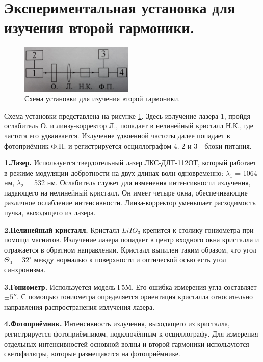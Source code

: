 \documentclass[12pt]{article}
\begin{document}
\section{Экспериментальная установка для изучения второй гармоники.}

\begin{figure}
  \begin{center}
    \includegraphics[width=0.48\textwidth]{pic2.png}
  \end{center}
  \caption{Схема установки для изучения второй гармоники.}
  \label{pic2}
\end{figure}
\hspace{0.5cm}
Схема установки представлена на рисунке \ref{pic2}. Здесь излучение лазера 1, пройдя ослабитель О. и линзу-корректор Л., попадает в нелинейный кристалл Н.К., где частота его удваивается. Излучение удвоенной частоты далее попадает в фотоприёмник Ф.П. и регистрируется осциллографом 4. 2 и 3 - блоки питания.

\textbf{1.}\textbf{Лазер.} Используется твердотельный лазер ЛКС-ДЛТ-112ОТ, который работает в режиме модуляции добротности на двух длинах волн одновременно: $\lambda_1$ = 1064 нм, $\lambda_2$ = 532 нм. Ослабитель служет для изменения интенсивности излучения, падающего на нелинейный кристалл. Он имеет четыре окна, обеспечивающие различное ослабление интенсивности. Линза-корректор уменьшает расходимость пучка, выходящего из лазера.

\textbf{2.}\textbf{Нелинейный кристалл.} Кристалл $LiIO_3$ крепится к столику гониометра при помощи магнитов. Излучение лазера попадает в центр входного окна кристалла и отражается в обратном направлении. Кристалл выпилен таким образом, что угол $\Theta_0=32^{\circ}$ между нормалью к поверхности и оптической осью есть угол синхронизма.

\textbf{3.}\textbf{Гониометр.} Используется модель Г5М. Его ошибка измерения угла составляет $\pm 5''$. С помощью гониометра определяется ориентация кристалла относительно направления распространения излучения лазера.

\textbf{4.}\textbf{Фотоприёмник.} Интенсивность излучения, выходящего из кристалла, регистрируется фотоприёмником, подключённым к осциллографу. Для измерения отдельных интенсивностей основной волны и второй гармоники используются светофильтры, которые размещаются на фотоприёмнике.
\end{document}
